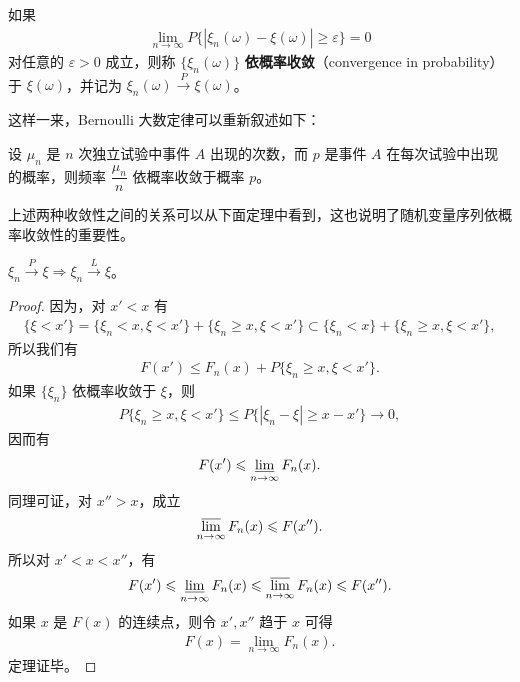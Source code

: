\documentclass[../../main.tex]{subfiles}
\begin{document}
\begin{definition}[依概率收敛]\label{definition:ch05-依概率收敛}
如果
\begin{align}
\lim_{n\to\infty}P\{|\xi_n(\omega)-\xi(\omega)|\geqslant\varepsilon\}=0
\end{align}
对任意的 $\varepsilon>0$ 成立，则称 $\{\xi_n(\omega)\}$ \textbf{依概率收敛}（convergence in probability）于 $\xi(\omega)$，并记为 $\xi_n(\omega)\xrightarrow{P}\xi(\omega)$。
\end{definition}

这样一来，Bernoulli 大数定律可以重新叙述如下：

设 $\mu_n$ 是 $n$ 次独立试验中事件 $A$ 出现的次数，而 $p$ 是事件 $A$ 在每次试验中出现的概率，则频率 $\dfrac{\mu_n}{n}$ 依概率收敛于概率 $p$。

上述两种收敛性之间的关系可以从下面定理中看到，这也说明了随机变量序列依概率收敛性的重要性。

\begin{theorem}[依概率收敛与依分布收敛的关系]\label{theorem:ch05-依概率收敛与依分布收敛关系}
$\xi_n\xrightarrow{P}\xi\Rightarrow\xi_n\xrightarrow{L}\xi$。
\end{theorem}

\begin{proof}
因为，对 $x'<x$ 有
\begin{align*}
\{\xi<x'\}=\{\xi_n<x,\xi<x'\}+\{\xi_n\geqslant x,\xi<x'\}
\subset\{\xi_n<x\}+\{\xi_n\geqslant x,\xi<x'\},
\end{align*}
所以我们有
\begin{align*}
F(x')\leqslant F_n(x)+P\{\xi_n\geqslant x,\xi<x'\}.
\end{align*}
如果 $\{\xi_n\}$ 依概率收敛于 $\xi$，则
\begin{align*}
P\{\xi_n\geqslant x,\xi<x'\}\leqslant P\{|\xi_n-\xi|\geqslant x-x'\}\to0,
\end{align*}
因而有
\begin{align*}
F(x')\leqslant\varliminf_{n\to\infty}F_n(x).
\end{align*}
同理可证，对 $x''>x$，成立
\begin{align*}
\varlimsup_{n\to\infty}F_n(x)\leqslant F(x'').
\end{align*}
所以对 $x'<x<x''$，有
\begin{align*}
F(x')\leqslant\varliminf_{n\to\infty}F_n(x)\leqslant\varlimsup_{n\to\infty}F_n(x)\leqslant F(x'').
\end{align*}
如果 $x$ 是 $F(x)$ 的连续点，则令 $x',x''$ 趋于 $x$ 可得
\begin{align*}
F(x)=\lim_{n\to\infty}F_n(x).
\end{align*}
定理证毕。
\end{proof}
\end{document}
